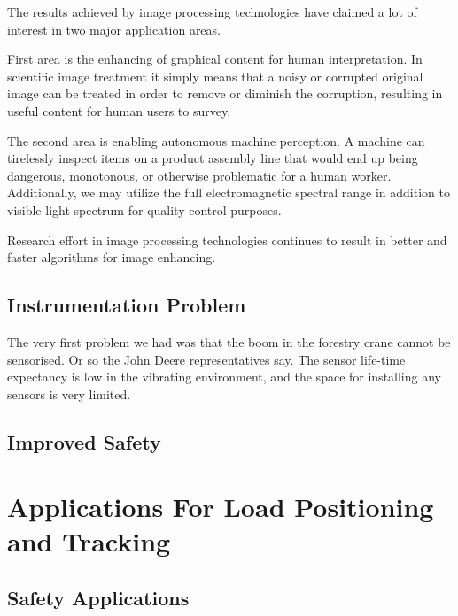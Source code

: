 \documentclass[12pt,a4paper,oneside,pdftex]{report}
\begin{document}
The results achieved by image processing technologies have claimed a lot of interest in two major application areas.

First area is the enhancing of graphical content for human interpretation. In scientific image treatment it simply means that a noisy or corrupted original image can be treated in order to remove or diminish the corruption, resulting in useful content for human users to survey.

The second area is enabling autonomous machine perception. A machine can tirelessly inspect items on a product assembly line that would end up being dangerous, monotonous, or otherwise problematic for a human worker. Additionally, we may utilize the full electromagnetic spectral range in addition to visible light spectrum for quality control purposes.
 
Research effort in image processing technologies continues to result in better and faster algorithms for image enhancing.

\section{Instrumentation Problem}

The very first problem we had was that the boom in the forestry crane cannot be sensorised. Or so the John Deere representatives say. The sensor life-time expectancy is low in the vibrating environment, and the space for installing any sensors is very limited.

\section{Improved Safety}


\section{}


\chapter{Applications For Load Positioning and Tracking}
\label{chapter:applications}

\section{Safety Applications}
\end{document}
